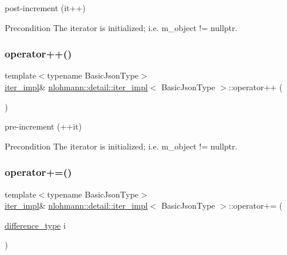 post-\/increment (it++) 

\begin{DoxyPrecond}{Precondition}
The iterator is initialized; i.\+e. {\ttfamily m\+\_\+object != nullptr}. 
\end{DoxyPrecond}
\mbox{\label{classnlohmann_1_1detail_1_1iter__impl_abdfe2a7f464400a7ab572782d14b922f}} 
\subsubsection{\texorpdfstring{operator++()}{operator++()}\hspace{0.1cm}{\footnotesize\ttfamily [2/2]}}
{\footnotesize\ttfamily template$<$typename Basic\+Json\+Type$>$ \\
\hyperlink{classnlohmann_1_1detail_1_1iter__impl}{iter\+\_\+impl}\& \hyperlink{classnlohmann_1_1detail_1_1iter__impl}{nlohmann\+::detail\+::iter\+\_\+impl}$<$ Basic\+Json\+Type $>$\+::operator++ (\begin{DoxyParamCaption}{ }\end{DoxyParamCaption})\hspace{0.3cm}{\ttfamily [inline]}}



pre-\/increment (++it) 

\begin{DoxyPrecond}{Precondition}
The iterator is initialized; i.\+e. {\ttfamily m\+\_\+object != nullptr}. 
\end{DoxyPrecond}
\mbox{\label{classnlohmann_1_1detail_1_1iter__impl_a3eef94f9d167046e7f773aeb6b78090c}} 
\subsubsection{\texorpdfstring{operator+=()}{operator+=()}}
{\footnotesize\ttfamily template$<$typename Basic\+Json\+Type$>$ \\
\hyperlink{classnlohmann_1_1detail_1_1iter__impl}{iter\+\_\+impl}\& \hyperlink{classnlohmann_1_1detail_1_1iter__impl}{nlohmann\+::detail\+::iter\+\_\+impl}$<$ Basic\+Json\+Type $>$\+::operator+= (\begin{DoxyParamCaption}\item[{\hyperlink{classnlohmann_1_1detail_1_1iter__impl_a2f7ea9f7022850809c60fc3263775840}{difference\+\_\+type}}]{i }\end{DoxyParamCaption})\hspace{0.3cm}{\ttfamily [inline]}}



